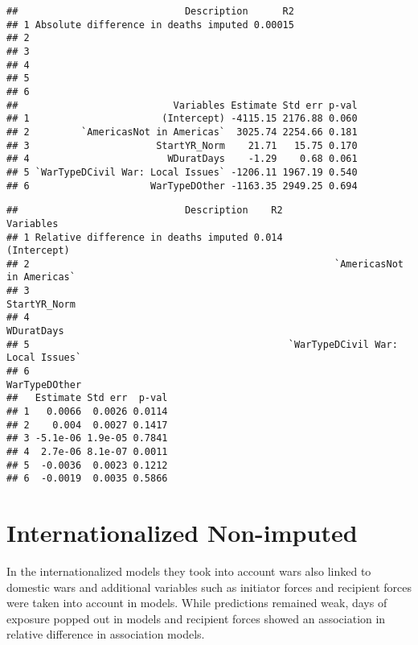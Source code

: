 \documentclass[
]{article}
\begin{document}
\begin{verbatim}
##                             Description      R2
## 1 Absolute difference in deaths imputed 0.00015
## 2                                              
## 3                                              
## 4                                              
## 5                                              
## 6                                              
##                           Variables Estimate Std err p-val
## 1                       (Intercept) -4115.15 2176.88 0.060
## 2         `AmericasNot in Americas`  3025.74 2254.66 0.181
## 3                      StartYR_Norm    21.71   15.75 0.170
## 4                        WDuratDays    -1.29    0.68 0.061
## 5 `WarTypeDCivil War: Local Issues` -1206.11 1967.19 0.540
## 6                     WarTypeDOther -1163.35 2949.25 0.694
\end{verbatim}

\begin{verbatim}
##                             Description    R2                         Variables
## 1 Relative difference in deaths imputed 0.014                       (Intercept)
## 2                                                     `AmericasNot in Americas`
## 3                                                                  StartYR_Norm
## 4                                                                    WDuratDays
## 5                                             `WarTypeDCivil War: Local Issues`
## 6                                                                 WarTypeDOther
##   Estimate Std err  p-val
## 1   0.0066  0.0026 0.0114
## 2    0.004  0.0027 0.1417
## 3 -5.1e-06 1.9e-05 0.7841
## 4  2.7e-06 8.1e-07 0.0011
## 5  -0.0036  0.0023 0.1212
## 6  -0.0019  0.0035 0.5866
\end{verbatim}

\hypertarget{internationalized-non-imputed}{%
\section{Internationalized
Non-imputed}\label{internationalized-non-imputed}}

In the internationalized models they took into account wars also linked
to domestic wars and additional variables such as initiator forces and
recipient forces were taken into account in models. While predictions
remained weak, days of exposure popped out in models and recipient
forces showed an association in relative difference in association
models.
\end{document}
